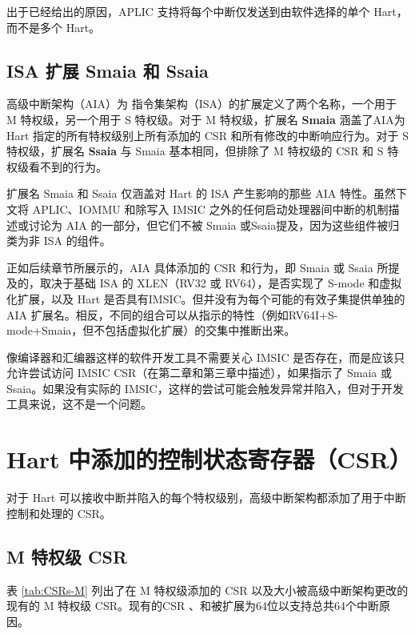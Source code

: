 \begin{translation}
\begin{commentary}
    出于已经给出的原因，APLIC 支持将每个中断仅发送到由软件选择的单个 Hart，而不是多个 Hart。
\end{commentary}

\subsection{ISA 扩展 Smaia 和 Ssaia}

高级中断架构（AIA）为 {\RISCV} 指令集架构（ISA）的扩展定义了两个名称，一个用于 M 特权级，另一个用于 S 特权级。对于 M 特权级，扩展名 \textbf{Smaia} 涵盖了AIA为 Hart 指定的所有特权级别上所有添加的 CSR 和所有修改的中断响应行为。对于 S 特权级，扩展名 \textbf{Ssaia} 与 Smaia 基本相同，但排除了 M 特权级的 CSR 和 S 特权级看不到的行为。

扩展名 Smaia 和 Ssaia 仅涵盖对 Hart 的 ISA 产生影响的那些 AIA 特性。虽然下文将 APLIC、IOMMU 和除写入 IMSIC 之外的任何启动处理器间中断的机制描述或讨论为 AIA 的一部分，但它们不被 Smaia 或Ssaia提及，因为这些组件被归类为非 ISA 的组件。

正如后续章节所展示的，AIA 具体添加的 CSR 和行为，即 Smaia 或 Ssaia 所提及的，取决于基础 ISA 的 XLEN（RV32 或 RV64），是否实现了 S-mode 和虚拟化扩展，以及 Hart 是否具有IMSIC。但并没有为每个可能的有效子集提供单独的 AIA 扩展名。相反，不同的组合可以从指示的特性（例如RV64I+S-mode+Smaia，但不包括虚拟化扩展）的交集中推断出来。

像编译器和汇编器这样的软件开发工具不需要关心 IMSIC 是否存在，而是应该只允许尝试访问 IMSIC CSR（在第二章和第三章中描述），如果指示了 Smaia 或 Ssaia。如果没有实际的 IMSIC，这样的尝试可能会触发异常并陷入，但对于开发工具来说，这不是一个问题。

\section{Hart 中添加的控制状态寄存器（CSR）}

对于{\RISCV} Hart 可以接收中断并陷入的每个特权级别，高级中断架构都添加了用于中断控制和处理的 CSR。

\subsection{M 特权级 CSR}

表 \ref{tab:CSRs-M} 列出了在 M 特权级添加的 CSR 以及大小被高级中断架构更改的现有的 M 特权级 CSR。现有的CSR 、和被扩展为64位以支持总共64个中断原因。


\end{translation}
